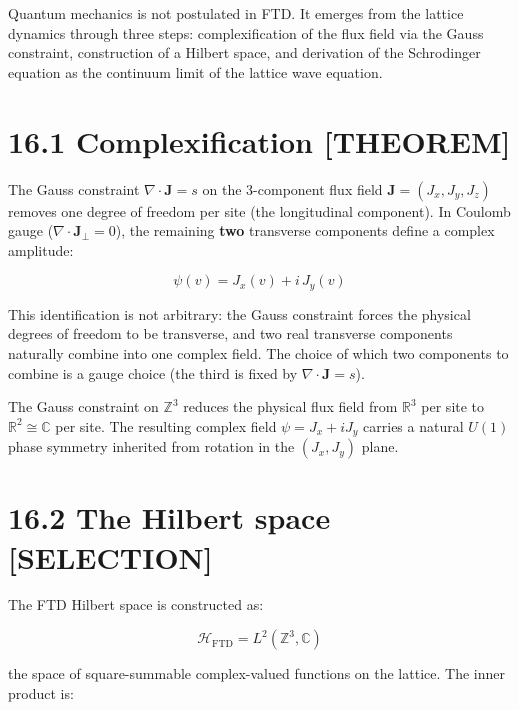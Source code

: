\documentclass[
  11pt,
  letterpaper,
  twoside,
  openright]{book}
\begin{document}
Quantum mechanics is not postulated in FTD. It emerges from the lattice
dynamics through three steps: complexification of the flux field via the
Gauss constraint, construction of a Hilbert space, and derivation of the
Schrodinger equation as the continuum limit of the lattice wave
equation.

\section{16.1 Complexification
{[}THEOREM{]}}\label{complexification-theorem}

The Gauss constraint \(\nabla \cdot \mathbf{J} = s\) on the 3-component
flux field \(\mathbf{J} = (J_x, J_y, J_z)\) removes one degree of
freedom per site (the longitudinal component). In Coulomb gauge
(\(\nabla \cdot \mathbf{J}_\perp = 0\)), the remaining \textbf{two}
transverse components define a complex amplitude:

\[
\psi(v) = J_x(v) + i \, J_y(v)
\tag{16.1}
\]

This identification is not arbitrary: the Gauss constraint forces the
physical degrees of freedom to be transverse, and two real transverse
components naturally combine into one complex field. The choice of which
two components to combine is a gauge choice (the third is fixed by
\(\nabla \cdot \mathbf{J} = s\)).

\begin{ftdtheorem}

The Gauss constraint on \(\mathbb{Z}^3\) reduces the physical flux field
from \(\mathbb{R}^3\) per site to \(\mathbb{R}^2 \cong \mathbb{C}\) per
site. The resulting complex field \(\psi = J_x + iJ_y\) carries a
natural \(U(1)\) phase symmetry inherited from rotation in the
\((J_x, J_y)\) plane.

\end{ftdtheorem}

\section{16.2 The Hilbert space
{[}SELECTION{]}}\label{the-hilbert-space-selection}

The FTD Hilbert space is constructed as:

\[
\mathcal{H}_{\text{FTD}} = L^2(\mathbb{Z}^3, \mathbb{C})
\tag{16.2}
\]

the space of square-summable complex-valued functions on the lattice.
The inner product is:
\end{document}
